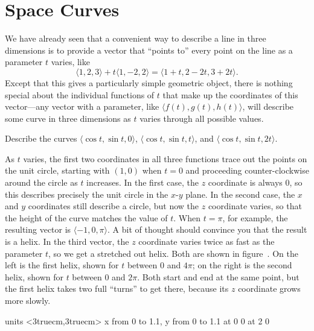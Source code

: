 \section{Space Curves}{}{}

We have already seen that a convenient way to describe a line in three
dimensions is to provide a vector that ``points to'' every point on
the line as a parameter $t$ varies, like
$$\langle 1,2,3\rangle+t\langle 1,-2,2\rangle
=\langle 1+t,2-2t,3+2t\rangle.$$
Except that this gives a particularly simple geometric object, there
is nothing special about the individual functions of $t$ that make up
the coordinates of this vector---any vector with a parameter, like
$\langle f(t),g(t),h(t)\rangle$, will describe some curve in three
dimensions as $t$ varies through all possible values. 

\begin{example} Describe the curves
$\langle \cos t,\sin t,0\rangle$,
$\langle \cos t,\sin t,t\rangle$, and
$\langle \cos t,\sin t,2t\rangle$.
\label{exam:helixes}

As $t$ varies, the first two coordinates in all three functions
trace out the points on the unit circle, starting
with $(1,0)$ when $t=0$ and proceeding counter-clockwise around the
circle as $t$ increases. In the first case, the $z$ coordinate is
always 0, so this describes precisely the unit circle in the $x$-$y$
plane. In the second case, the $x$ and $y$ coordinates still describe
a circle, but now 
the $z$ coordinate varies, so that the
height of the curve matches the value of $t$. When $t=\pi$, for
example, the resulting vector is $\langle -1,0,\pi\rangle$. A bit of
thought should convince you that the result is a helix. In the third
vector, the $z$ coordinate varies twice as fast as the parameter $t$,
so we get a stretched out helix. Both are shown in
figure~. On the left is the first helix, shown for
$t$ between 0 and $4\pi$; on the right is the second helix, shown for
$t$ between 0 and $2\pi$. Both start and end at the same point, but
the first helix takes two full ``turns'' to get there, because its $z$
coordinate grows more slowly.
\end{example}

\figure
\vbox{\beginpicture
\normalgraphs
\ninepoint
\setcoordinatesystem units <3truecm,3truecm>
\setplotarea x from 0 to 1.1, y from 0 to 1.1
 at 0 0
 at 2 0
\endpicture}
\endfigure{Two helixes.
(\expandafter\url\expandafter{\liveurl helixes.html}%
AP\endurl)}

